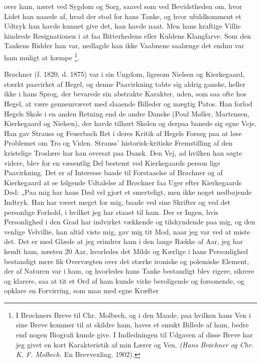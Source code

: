 \documentclass[12pt,a4paper,openany]{book}
\newcommand{\opage}[1]{\marginnote{\footnotesize\textit{[#1]}}}
\begin{document}
over ham, næret ved Sygdom og Sorg, saavel som ved Bevidstheden om, hvor Lidet
han naaede af, hvad der stod for hans Tanke, og hvor ufuldkomment et Udtryk han
havde kunnet give det, han havde naat. Men hans kraftige Villie hindrede
Resignationen i at faa Bitterhedens eller Kuldens Klangfarve. Som den Tankens
Ridder han var, nedlagde han ikke Vaabnene saalænge det endnu var ham muligt at
kæmpe%
\footnote[1]{I Brøchners Breve til Chr. Molbech, og i den Maade, paa hvilken
hans Ven i sine Breve kommer til at skildre ham, haves et smukt Billede af ham,
bedre end nogen Biografi kunde give. I Indledningen til Udgaven af disse Breve
har jeg givet en kort Karakteristik af min Lærer og Ven. \textit{(Hans Brøchner
og Chr. K. F. Molbech.} En Brevvexling. 1902).}.

Brøchner (f. 1820, d. 1875) var i sin Ungdom, ligesom Nielsen og Kierkegaard,
stærkt paavirket af Hegel, og denne Paavirkning tabte sig aldrig ganske, heller
ikke i hans Sprog, der bevarede sin abstrakte Karakter, uden, som saa ofte hos
Hegel, at være gennemvævet med slaaende Billeder og mægtig Patos. Han forlod
Hegels Skole i en anden Retning end de andre Danske (Poul Møller, Martensen,
Kierkegaard og Nielsen), der havde tilhørt Skolen og derpaa banede sig egne
Veje. Han gav Strauss og Feuerbach Ret i deres Kritik af Hegels Forsøg paa at
løse Problemet om Tro og Viden. Strauss' historisk-kritiske Fremstilling af den
kristelige Troslære har han oversat paa Dansk. Den Vej, ad hvilken han søgte
videre, blev for en væsentlig Del bestemt ved Kierkegaards person%
\setcounter{footnote}{0}%
\opage{198}lige Paavirkning. Det er af Interesse baade til Forstaaelse af
Brøchner og af Kierkegaard at se følgende Udtalelse af Brøchner faa Uger efter
Kierkegaards Død: „Paa mig har hans Død vel gjort et smerteligt, men ikke noget
nedbøjende Indtryk. Han har været meget for mig, baade ved sine Skrifter og ved
det personlige Forhold, i hvilket jeg har staaet til ham. Der er Ingen, hvis
Personlighed i den Grad har indvirket vækkende og tilskyndende paa mig, og den
venlige Velvillie, han altid viste mig, gav mig tit Mod, naar jeg var ved at
miste det. Det er med Glæde at jeg erindrer ham i den lange Række af Aar, jeg
har kendt ham, næsten 20 Aar, hvorledes det Milde og Kærlige i hans
Personlighed bestandigt mere fik Overvægten over det stærke ironiske og
polemiske Element, der af Naturen var i ham, og hvorledes hans Tanke bestandigt
blev rigere, sikrere og klarere, saa at tit et Ord af ham kunde virke
beroligende og forsonende, og opklare en Forvirring, som man med egne Kræfter
\end{document}
